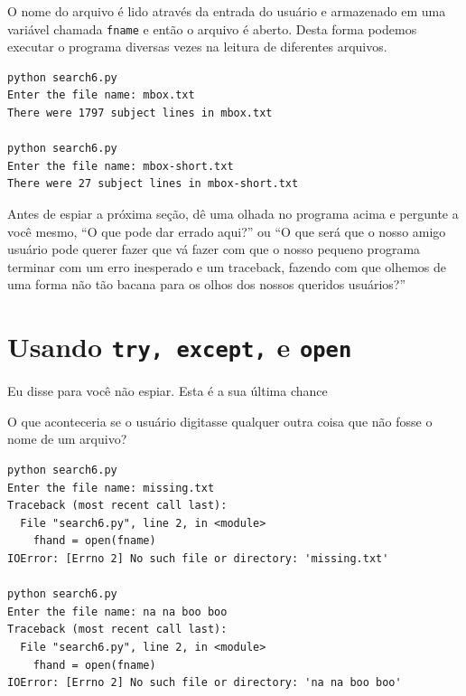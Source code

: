 O nome do arquivo é lido através da entrada do usuário e armazenado
em uma variável chamada {\tt fname} e então o arquivo é aberto. Desta
forma podemos executar o programa diversas vezes na leitura de 
diferentes arquivos.

\beforeverb
\begin{verbatim}
python search6.py 
Enter the file name: mbox.txt
There were 1797 subject lines in mbox.txt

python search6.py 
Enter the file name: mbox-short.txt
There were 27 subject lines in mbox-short.txt
\end{verbatim}
\afterverb

Antes de espiar a próxima seção, dê uma olhada no programa acima
e pergunte a você mesmo, ``O que pode dar errado aqui?'' ou ``O que
será que o nosso amigo usuário pode querer fazer que vá fazer com que
o nosso pequeno programa terminar com um erro inesperado e um traceback,
fazendo com que olhemos de uma forma não tão bacana para os olhos dos
nossos queridos usuários?''

\section{Usando {\tt try, except,} e {\tt open}}

Eu disse para você não espiar. Esta é a sua última chance

O que aconteceria se o usuário digitasse qualquer outra coisa
que não fosse o nome de um arquivo?

\beforeverb
\begin{verbatim}
python search6.py 
Enter the file name: missing.txt
Traceback (most recent call last):
  File "search6.py", line 2, in <module>
    fhand = open(fname)
IOError: [Errno 2] No such file or directory: 'missing.txt'

python search6.py 
Enter the file name: na na boo boo
Traceback (most recent call last):
  File "search6.py", line 2, in <module>
    fhand = open(fname)
IOError: [Errno 2] No such file or directory: 'na na boo boo'
\end{verbatim}
\afterverb

